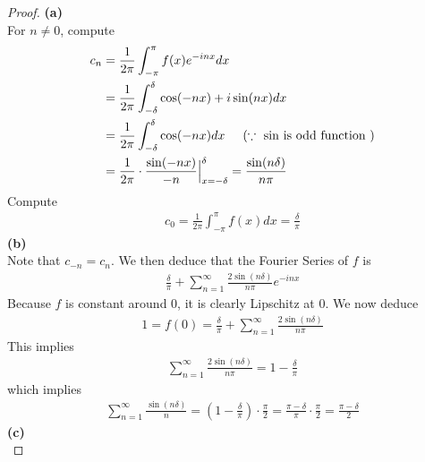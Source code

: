 \documentclass{report}
\begin{document}
\begin{proof}
\textbf{(a)}\\

For $n\neq 0$, compute 
\begin{align*}
c_n &= \frac{1}{2\pi}\int_{-\pi}^{\pi}f(x)e^{-i nx}dx\\
&=\frac{1}{2\pi}\int_{-\delta}^\delta \cos (-nx)+ i \sin (nx)dx\\
&=\frac{1}{2\pi}\int_{-\delta}^\delta \cos (-nx)dx \hspace{0.5cm}(\because \text{ $\sin$ is odd function })\\
&=\frac{1}{2\pi} \cdot \frac{\sin (-nx)}{-n}\Big |_{x=-\delta}^{\delta}= \frac{ \sin (n\delta)}{n \pi }
\end{align*}
Compute 
\begin{align*}
c_0=\frac{1}{2\pi}\int^{\pi}_{-\pi}f(x)dx=\frac{\delta}{\pi}
\end{align*}
\textbf{(b)}\\

Note that $c_{-n}=c_n$. We then deduce that the Fourier Series of $f$ is 
\begin{align*}
\frac{\delta}{\pi}+\sum_{n=1}^\infty \frac{2\sin (n\delta)}{n\pi} e^{-i nx}
\end{align*}
Because $f$ is constant around $0$, it is clearly Lipschitz at $0$. We now deduce
 \begin{align*}
1=f(0)=\frac{\delta}{\pi} + \sum_{n=1}^\infty \frac{2 \sin (n\delta)}{n \pi }
\end{align*}
This implies 
\begin{align*}
\sum_{n=1}^\infty \frac{2\sin (n \delta)}{n\pi}=1-\frac{\delta}{\pi}
\end{align*}
which implies 
\begin{align*}
\sum_{n=1}^\infty \frac{\sin (n\delta)}{n}=(1-\frac{\delta}{\pi})\cdot \frac{\pi}{2}=\frac{\pi - \delta}{\pi}\cdot \frac{\pi}{2}=\frac{\pi -\delta}{2}
\end{align*}
\textbf{(c)} \\


\end{proof}
\end{document}
